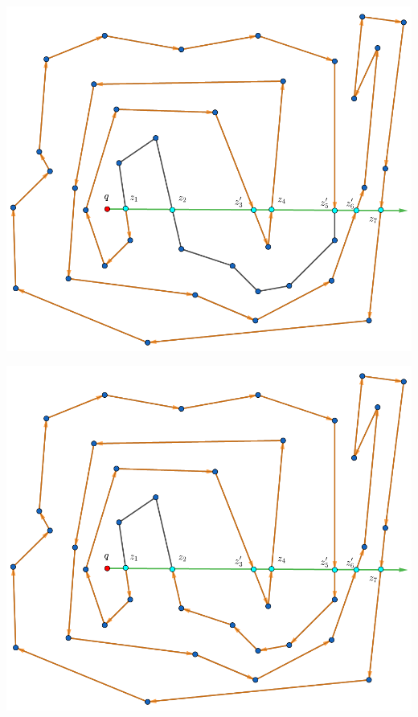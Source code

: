 \begin{frame}
  \centering \includegraphics[width=0.45 \paperwidth]{images/Poda/10.png}
\end{frame}

\begin{frame}
  \centering \includegraphics[width=0.45 \paperwidth]{images/Poda/11.png}
\end{frame}

